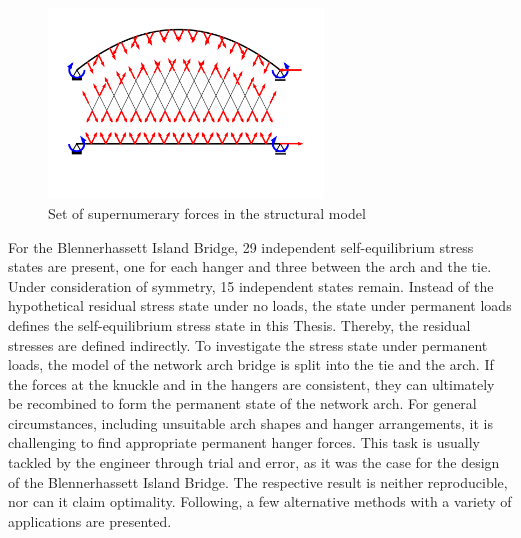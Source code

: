 \begin{figure}[H]
    \centering
    \includegraphics[trim={1cm 16cm 4cm 6.5cm},clip, width=0.65\textwidth]{overleaf/Pictures/Supernumerary forces.png}
    \caption{Set of supernumerary forces in the structural model}
    \label{fig:super_forces}
\end{figure}

For the Blennerhassett Island Bridge, 29 independent self-equilibrium stress states are present, one for each hanger and three between the arch and the tie. Under consideration of symmetry, 15 independent states remain. Instead of the hypothetical residual stress state under no loads, the state under permanent loads defines the self-equilibrium stress state in this Thesis. Thereby, the residual stresses are defined indirectly. 
To investigate the stress state under permanent loads, the model of the network arch bridge is split into the tie and the arch. If the forces at the knuckle and in the hangers are consistent, they can ultimately be recombined to form the permanent state of the network arch.
For general circumstances, including unsuitable arch shapes and hanger arrangements, it is challenging to find appropriate permanent hanger forces. This task is usually tackled by the engineer through trial and error, as it was the case for the design of the Blennerhassett Island Bridge. The respective result is neither reproducible, nor can it claim optimality. Following, a few alternative methods with a variety of applications are presented. 



